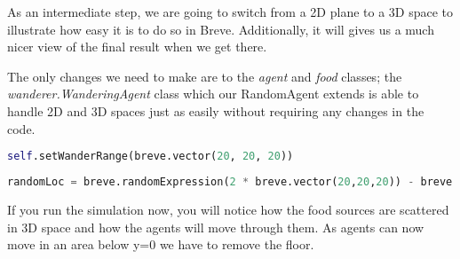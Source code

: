 As an intermediate step, we are going to switch from a 2D plane to a 3D space to illustrate how easy it is to do so in Breve. Additionally, it will gives us a much nicer view of the final result when we get there. 

The only changes we need to make are to the \textit{agent} and \textit{food} classes; the \textit{wanderer.WanderingAgent} class which our RandomAgent extends is able to handle 2D and 3D spaces just as easily without requiring any changes in the code. 


\begin{fullwidth}
\begin{lstlisting}[language=Python]
self.setWanderRange(breve.vector(20, 20, 20))
\end{lstlisting}
\end{fullwidth}


\begin{fullwidth}
\begin{lstlisting}[language=Python]
randomLoc = breve.randomExpression(2 * breve.vector(20,20,20)) - breve.vector(20,20,20)
\end{lstlisting}
\end{fullwidth}

If you run the simulation now, you will notice how the food sources are scattered in 3D space and how the agents will move through them. As agents can now move in an area below y=0 we have to remove the floor.

